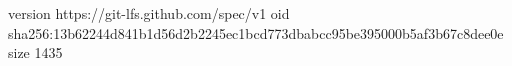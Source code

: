 version https://git-lfs.github.com/spec/v1
oid sha256:13b62244d841b1d56d2b2245ec1bcd773dbabcc95be395000b5af3b67c8dee0e
size 1435
